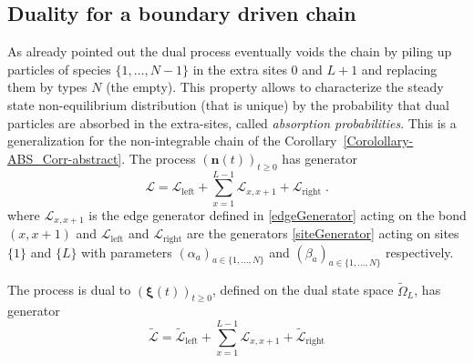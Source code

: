 \documentclass[10pt]{article}
\numberwithin{equation}{section}
\numberwithin{equation}{subsection}
\newcommand{\dt}{\;.}
\begin{document}
\subsection{Duality for a boundary driven chain}\label{Subsection-ss-nonI}
 As already pointed out the dual process eventually voids the chain by piling up particles of species $\{1,\ldots,N-1\}$ in the extra sites $0$ and $L+1$ and replacing them by types $N$ (the empty). This property allows to characterize the steady state non-equilibrium distribution (that is unique) by the probability that dual particles are absorbed in the extra-sites, called \textit{absorption probabilities}. This is a generalization for the non-integrable chain of the Corollary~\ref{Corolollary-ABS_Corr-abstract}. The process $\left(\bm{n}(t)\right)_{t\geq0}$ has generator
\begin{equation}
	\mathcal{L}=\mathcal{L}_{\text{left}}+\sum_{x=1}^{L-1}\mathcal{L}_{x,x+1}+\mathcal{L}_{\text{right}}\dt
\end{equation} 
where $\mathcal{L}_{x,x+1}$ is the edge generator defined in \eqref{edgeGenerator} acting on the bond $(x,x+1)$ and $\mathcal{L}_{\text{left}}$ and $\mathcal{L}_{\text{right}}$ are the generators \eqref{siteGenerator} acting on sites $\{1\}$ and $\{L\}$ with parameters $(\alpha_{a})_{a\in \{1,\ldots,N\}}$ and $(\beta_{a})_{a\in \{1,\ldots,N\}}$ respectively. 
\begin{comment}
\begin{equation}
	\mathcal{L}_{x,x+1}f(\bm{n})=\sum_{a,b=0}^{N}n_{a}^{x}n_{b}^{x+1}\left(f(\bm{n}-\bm{\delta}_{a}^{x}+\bm{\delta}_{b}^{x}+\bm{\delta}_{a}^{x+1}-\bm{\delta}_{b}^{x+1})-f(\bm{n})\right)
\end{equation}
while at the boundaries 
\begin{equation}
	\mathcal{L}_{\text{left}}f(\bm{n})=\sum_{a,b=0}^{N}\alpha_{a}n_{b}^{1}\left(f(\bm{n}-\bm{\delta}_{b}^{x}+\bm{\delta}_{a}^{x})-f(\bm{n})\right)\qquad \mathcal{L}_{\text{right}}f(\bm{n})=\sum_{a,b=0}^{N}\beta_{a}n_{b}^{L}\left(f(\bm{n}-\bm{\delta}_{b}^{x}+\bm{\delta}_{a}^{x})-f(\bm{n})\right)\dt
\end{equation}
\end{comment}
The process is dual to $(\bm{\xi}(t))_{t\geq0}$, defined on the dual state space $\widetilde{\Omega}_{L}$, has generator
\begin{equation}
	\widetilde{\mathcal{L}}=\widetilde{\mathcal{L}}_{\text{left}}+\sum_{x=1}^{L-1}\mathcal{L}_{x,x+1}+\widetilde{\mathcal{L}}_{\text{right}}
\end{equation} 
\end{document}
